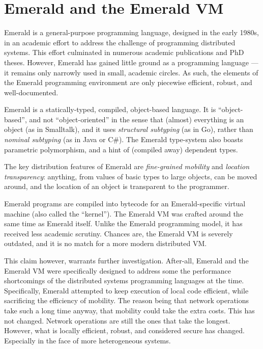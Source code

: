 \section{Emerald and the Emerald VM}

Emerald is a general-purpose programming language, designed in the
early 1980s, in an academic effort to address the challenge of
programming distributed systems. This effort culminated in numerous
academic publications\cite{emerald:tse:1987, emerald:tocs:1988,
emerald:spe:1991} and PhD theses\cite{emerald:phd:norman-c-hutchinson,
emerald:phd:eric-jul, emerald:phd:niels-christian-juul}. However,
Emerald has gained little ground as a programming language --- it
remains only narrowly used in small, academic circles. As such, the
elements of the Emerald programming environment are only piecewise
efficient, robust, and well-documented.

Emerald is a statically-typed, compiled, object-based language. It is
``object-based'', and not ``object-oriented'' in the sense that
(almost) everything is an object (as in Smalltalk), and it uses
\emph{structural subtyping} (as in Go), rather than \emph{nominal
subtyping} (as in Java or C\#). The Emerald type-system also boasts
parametric polymorphism, and a hint of (compiled away) dependent
types.

The key distribution features of Emerald are \emph{fine-grained
mobility} and \emph{location transparency}: anything, from values of
basic types to large objects, can be moved around, and the location of
an object is transparent to the programmer.

Emerald programs are compiled into bytecode for an Emerald-specific
virtual machine (also called the
``kernel''\cite{emerald:phd:eric-jul}). The Emerald VM was crafted
around the same time as Emerald itself.  Unlike the Emerald
programming model, it has received less academic scrutiny. Chances
are, the Emerald VM is severely outdated, and it is no match for a
more modern distributed VM.

This claim however, warrants further investigation. After-all, Emerald
and the Emerald VM were specifically designed to address some the
performance shortcomings of the distributed systems programming
languages at the time\cite{emerald:phd:eric-jul}. Specifically,
Emerald attempted to keep execution of local code efficient, while
sacrificing the efficiency of mobility. The reason being that network
operations take such a long time anyway, that mobility could take the
extra costs. This has not changed. Network operations are still the
ones that take the longest. However, what is locally efficient,
robust, and considered secure has changed. Especially in the face of
more heterogeneous systems.
